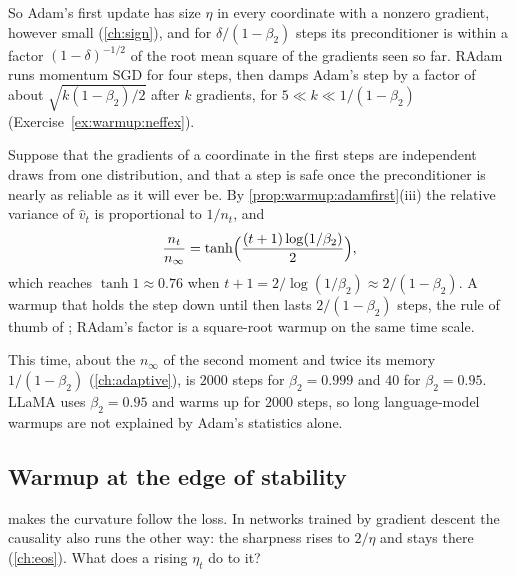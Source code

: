 \begin{refsection}
So Adam's first update has size $\eta$ in every coordinate with a nonzero gradient, however small (\cref{ch:sign}), and for $\delta/(1-\beta_2)$ steps its preconditioner is within a factor $(1-\delta)^{-1/2}$ of the root mean square of the gradients seen so far. RAdam \parencite{LiuEtAl2020RAdam} runs momentum SGD for four steps, then damps Adam's step by a factor of about $\sqrt{k(1-\beta_2)/2}$ after $k$ gradients, for $5\ll k\ll1/(1-\beta_2)$ (Exercise~\ref{ex:warmup:neffex}).

\begin{heuristic}
Suppose that the gradients of a coordinate in the first steps are independent draws from one distribution, and that a step is safe once the preconditioner is nearly as reliable as it will ever be. By \cref{prop:warmup:adamfirst}(iii) the relative variance of $\hat v_t$ is proportional to $1/n_t$, and
\[
  \frac{n_t}{n_\infty}=\tanh\Bigl(\frac{(t+1)\log(1/\beta_2)}2\Bigr),
\]
which reaches $\tanh1\approx0.76$ when $t+1=2/\log(1/\beta_2)\approx2/(1-\beta_2)$. A warmup that holds the step down until then lasts $2/(1-\beta_2)$ steps, the rule of thumb of \textcite{MaYarats2021}; RAdam's factor is a square-root warmup on the same time scale.
\end{heuristic}

This time, about the  $n_\infty$ of the second moment and twice its memory $1/(1-\beta_2)$ (\cref{ch:adaptive}), is $2000$ steps for $\beta_2=0.999$ and $40$ for $\beta_2=0.95$. LLaMA uses $\beta_2=0.95$ and warms up for $2000$ steps, so long language-model warmups are not explained by Adam's statistics alone.

\subsection{Warmup at the edge of stability}\label{sec:warmup:edge}

 makes the curvature follow the loss. In networks trained by gradient descent the causality also runs the other way: the sharpness rises to $2/\eta$ and stays there (\cref{ch:eos}). What does a rising $\eta_t$ do to it?


\end{refsection}
